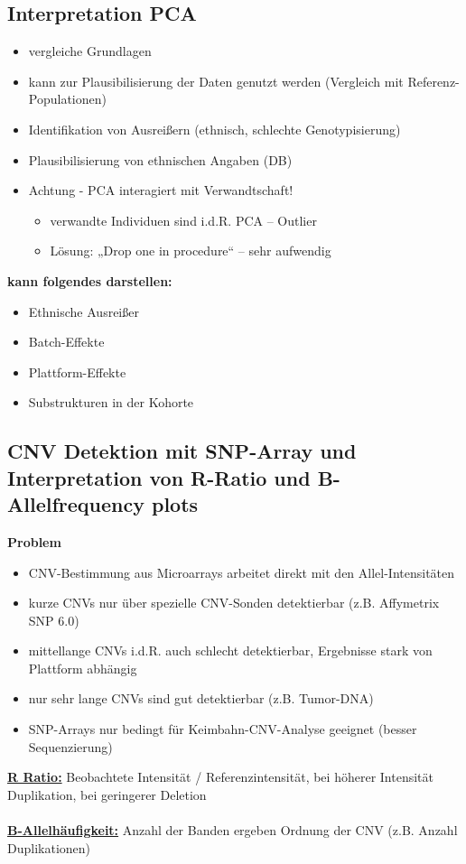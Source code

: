 \subsection{Interpretation PCA}
\begin{itemize}
	\item vergleiche Grundlagen
	\item kann zur Plausibilisierung der Daten genutzt werden (Vergleich mit Referenz-Populationen)
	\item Identifikation von Ausreißern (ethnisch, schlechte Genotypisierung)
	\item Plausibilisierung von ethnischen Angaben (DB)
	\item Achtung - PCA interagiert mit Verwandtschaft!
	\begin{itemize}
		\item verwandte Individuen sind i.d.R. PCA – Outlier
		\item Lösung: „Drop one in procedure“ – sehr aufwendig
	\end{itemize}
\end{itemize}

\textbf{kann folgendes darstellen:}
\begin{itemize}
	\item Ethnische Ausreißer
	\item Batch-Effekte
	\item Plattform-Effekte
	\item Substrukturen in der Kohorte
\end{itemize}

\subsection{CNV Detektion mit SNP-Array und Interpretation von R-Ratio und B-Allelfrequency plots}
\textbf{Problem}
\begin{itemize}
	\item CNV-Bestimmung aus Microarrays arbeitet direkt mit den Allel-Intensitäten
	\item kurze CNVs nur über spezielle CNV-Sonden detektierbar (z.B. Affymetrix SNP 6.0)
	\item mittellange CNVs i.d.R. auch schlecht detektierbar, Ergebnisse stark von Plattform abhängig
	\item nur sehr lange CNVs sind gut detektierbar (z.B. Tumor-DNA)
	\item SNP-Arrays nur bedingt für Keimbahn-CNV-Analyse geeignet (besser Sequenzierung)
\end{itemize}

\underline{\textbf{R Ratio:}} Beobachtete Intensität / Referenzintensität, bei höherer Intensität Duplikation, bei geringerer Deletion\\\\
\underline{\textbf{B-Allelhäufigkeit:}} Anzahl der Banden ergeben Ordnung der CNV (z.B. Anzahl Duplikationen)